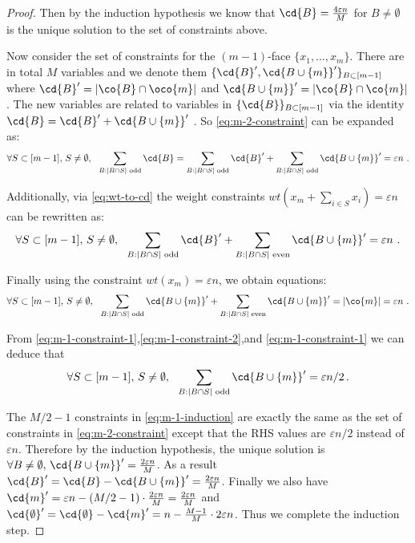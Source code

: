 \documentclass[10pt,a4paper]{article}
\theoremstyle{definition}
\theoremstyle{remark}
\newcommand{\card}[1]{\lvert#1\rvert}
\numberwithin{equation}{section}
\begin{document}
\begin{proof}
    Then by the induction hypothesis we know that 
    $\cd{B} = \frac{4\varepsilon n }{M}$ for $B \neq \emptyset $ is the unique solution to the set of constraints above.

    Now consider the set of constraints for the $(m-1)$-face $\{x_1,\dots,x_m\}$. 
    There are in total $M$ variables and we denote them $\{\cd{B}',\cd{B\cup\{m\}}'\}_{B\subset[m-1]}$ where $\cd{B}' =  \card{\co{B}\cap \oco{m}}$ and $\cd{B\cup\{m\}}' = \card{\co{B}\cap \co{m}}$. 
    The new variables are related to variables in $\{\cd{B}\}_{B\subset[m-1]}$ via the identity $\cd{B} = \cd{B}'+\cd{B\cup\{m\}}'$ . 
    So \eqref{eq:m-2-constraint} can be expanded as:
    \begin{equation}\label{eq:m-1-constraint-1}
        \forall S\subset[m-1],\,S\neq \emptyset,~~  \sum_{B: |B\cap S| \text{ odd}} \cd{B} = \sum_{B: |B\cap S| \text{ odd}} \cd{B}' + \sum_{B: |B\cap S| \text{ odd}} \cd{B\cup\{m\}}' =  \varepsilon n~.
    \end{equation}
    

    Additionally, via \eqref{eq:wt-to-cd} the weight constraints $wt\left(x_m + \sum_{i\in S} x_i\right) = \varepsilon n$ can be rewritten as:
    \begin{equation}\label{eq:m-1-constraint-2}
        \forall S\subset[m-1],\,S\neq \emptyset,~~ \sum_{B: |B\cap S| \text{ odd}} \cd{B}' + \sum_{B: |B\cap S| \text{ even}} \cd{B\cup\{m\}}' = \varepsilon n ~.
    \end{equation}

    Finally using the constraint $wt(x_m) = \varepsilon n$, we obtain equations:
    \begin{equation}\label{eq:m-1-constraint-3}
        \forall S\subset[m-1],\,S\neq \emptyset,~~\sum_{B: |B\cap S| \text{ odd}} \cd{B\cup\{m\}}' + \sum_{B: |B\cap S| \text{ even}} \cd{B\cup\{m\}}' = \card{\co{m}} = \varepsilon n ~.
    \end{equation}

    From \eqref{eq:m-1-constraint-1},\eqref{eq:m-1-constraint-2},and \eqref{eq:m-1-constraint-1} we can deduce that 
    \begin{equation}\label{eq:m-1-induction}
    \forall S\subset[m-1],\,S\neq \emptyset,~~ \sum_{B: |B\cap S| \text{ odd}} \cd{B\cup\{m\}}' = \varepsilon n/2\,.
    \end{equation}

    The $M/2-1$ constraints in \eqref{eq:m-1-induction} are exactly the same as the set of constraints in \eqref{eq:m-2-constraint} except that the RHS values are $\varepsilon n/2$ instead of $\varepsilon n$. Therefore by the induction hypothesis, the unique solution is $\forall B \neq \emptyset,\, \cd{B\cup\{m\}}'= \frac{2\varepsilon n}{M}$. As a result $\cd{B}'= \cd{B}-\cd{B\cup\{m\}}' = \frac{2\varepsilon n}{M}$. Finally we also have $\cd{m}' = \varepsilon n - (M/2-1)\cdot \frac{2\varepsilon n}{M} = \frac{2\varepsilon n}{M}$ and $\cd{\emptyset}' = \cd{\emptyset}-\cd{m}' = n - \frac{M-1}{M}\cdot 2\varepsilon n$. Thus we complete the induction step.
\end{proof}
\end{document}
